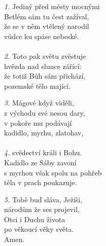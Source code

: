 \begin{translatioMulticol}{3}
{\color{red}\textit{1.}} Jediný před městy mocnými\\
Betlém sám tu čest zažíval,\\
že se v něm vtělený narodil\\
vůdce ku spáse nebeské.\\
\\
{\color{red}\textit{2.}} Toto pak světu zvěstuje\\
hvězda nad slunce zářící:\\
že totiž Bůh sám přichází,\\
pozemské tělo mající.\columnbreak

{\color{red}\textit{3.}} Mágové když \ji{} viděli,\\
z východu své nesou dary,\\
v pokoře mu podávají\\
kadidlo, myrhu, zlatohav,\\
\\
{\color{red}\textit{4.}} svědectví králi i Bohu.\\
Kadidlo ze Sáby zavoní\\
s myrhou však spolu na pohřeb\\
těla v prach poukazuje.\columnbreak

{\color{red}\textit{5.}} Tobě buď sláva, Ježíši,\\
národům že ses projevil,\\
Otci i Duchu života\\
po věkoucí věky světa.\\
Amen.
\end{translatioMulticol}
